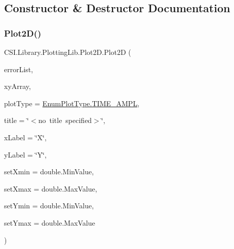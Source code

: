 \subsection{Constructor \& Destructor Documentation}
\mbox{\label{class_c_s_i_1_1_library_1_1_plotting_lib_1_1_plot2_d_a387e59212204675da745d312a9b63c98}} 
\subsubsection{\texorpdfstring{Plot2D()}{Plot2D()}\hspace{0.1cm}{\footnotesize\ttfamily [1/2]}}
{\footnotesize\ttfamily C\+S\+I.\+Library.\+Plotting\+Lib.\+Plot2\+D.\+Plot2D (\begin{DoxyParamCaption}\item[{\mbox{\hyperlink{class_c_s_i_1_1_library_1_1_errors_1_1_error_list}{Error\+List}}}]{error\+List,  }\item[{\mbox{\hyperlink{struct_c_s_i_1_1_library_1_1_data_types_1_1_x_y___point}{X\+Y\+\_\+\+Point}} \mbox{[}$\,$\mbox{]}}]{xy\+Array,  }\item[{\mbox{\hyperlink{class_c_s_i_1_1_library_1_1_plotting_lib_1_1_plot2_d_ad94829020c4869820a1ecb690d5ea98f}{Enum\+Plot\+Type}}}]{plot\+Type = {\ttfamily \mbox{\hyperlink{class_c_s_i_1_1_library_1_1_plotting_lib_1_1_plot2_d_ad94829020c4869820a1ecb690d5ea98fa5fa9cc75a244a268a87e9aa160bab231}{Enum\+Plot\+Type.\+T\+I\+M\+E\+\_\+\+A\+M\+PL}}},  }\item[{string}]{title = {\ttfamily \char`\"{}$<$no~title~specified$>$\char`\"{}},  }\item[{string}]{x\+Label = {\ttfamily \char`\"{}X\char`\"{}},  }\item[{string}]{y\+Label = {\ttfamily \char`\"{}Y\char`\"{}},  }\item[{double}]{set\+Xmin = {\ttfamily double.MinValue},  }\item[{double}]{set\+Xmax = {\ttfamily double.MaxValue},  }\item[{double}]{set\+Ymin = {\ttfamily double.MinValue},  }\item[{double}]{set\+Ymax = {\ttfamily double.MaxValue} }\end{DoxyParamCaption})\hspace{0.3cm}{\ttfamily [inline]}}



